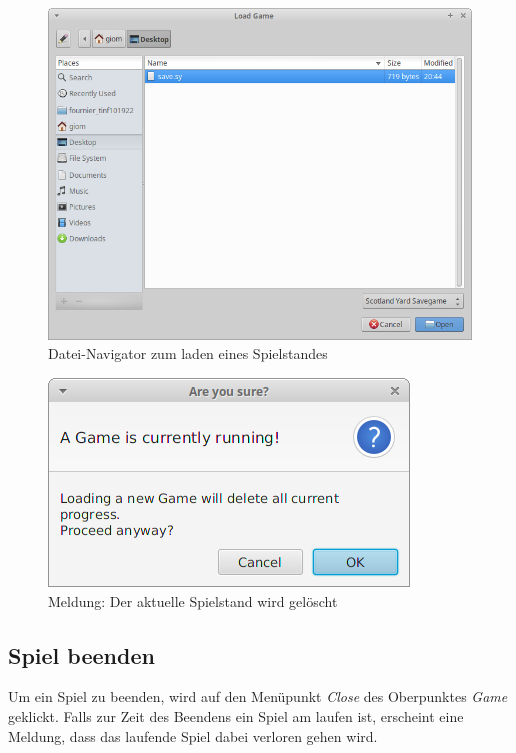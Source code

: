             \begin{figure}[H]
                \centering
                \includegraphics[scale=0.4]{img/benutzerhandbuch/dialog_load.png}   
                \caption{Datei-Navigator zum laden eines Spielstandes}
            \end{figure}

            \begin{figure}[H]
                \centering
                \includegraphics[scale=0.7]{img/benutzerhandbuch/dialog_load_override.png}   
                \caption{Meldung: Der aktuelle Spielstand wird gelöscht}
            \end{figure}
                
        \subsection{Spiel beenden}
            Um ein Spiel zu beenden, wird auf den Menüpunkt \textit{Close} des Oberpunktes \textit{Game} geklickt.
            Falls zur Zeit des Beendens ein Spiel am laufen ist, erscheint eine Meldung, dass das laufende Spiel dabei verloren gehen wird.
